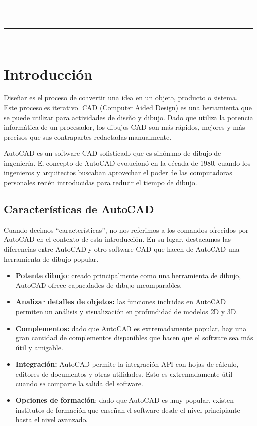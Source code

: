 \documentclass[letterpaper,pdftex]{article}
\begin{document}
\noindent
\textcolor{gray}{\rule{\textwidth}{0.5pt}}\\
\renewcommand{\tablename}{Tabla}
\renewcommand{\arraystretch}{1.2}
\renewcommand\contentsname{Contenido}
\tableofcontents

\noindent
\textcolor{gray}{\rule{\textwidth}{0.5pt}}\\

\section{Introducci\'on}

Diseñar es el proceso de convertir una idea en un objeto, producto o sistema. Este proceso es iterativo. CAD (Computer Aided Design) es una herramienta que se puede utilizar para actividades de diseño y dibujo. Dado que utiliza la potencia informática de un procesador, los dibujos CAD son más rápidos, mejores y más precisos que sus contrapartes redactadas manualmente.

AutoCAD es un software CAD sofisticado que es sinónimo de dibujo de ingeniería. El concepto de AutoCAD evolucionó en la década de 1980, cuando los ingenieros y arquitectos buscaban aprovechar el poder de las computadoras personales recién introducidas para reducir el tiempo de dibujo.

\subsection{Características de AutoCAD}

Cuando decimos ``características'', no nos referimos a los comandos ofrecidos por AutoCAD en el contexto de esta introducción. En su lugar, destacamos las diferencias entre AutoCAD y otro software CAD que hacen de AutoCAD una herramienta de dibujo popular.

\begin{itemize}

\item\textbf{Potente dibujo}: creado principalmente como una herramienta de dibujo, AutoCAD ofrece capacidades de dibujo incomparables.

\item \textbf{Analizar detalles de objetos:} las funciones incluidas en AutoCAD permiten un análisis y visualización en profundidad de modelos 2D y 3D.

\item \textbf{Complementos:} dado que AutoCAD es extremadamente popular, hay una gran cantidad de complementos disponibles que hacen que el software sea más útil y amigable.

\item \textbf{Integración:} AutoCAD permite la integración API con hojas de cálculo, editores de documentos y otras utilidades. Esto es extremadamente útil cuando se comparte la salida del software.

\item \textbf{Opciones de formación}: dado que AutoCAD es muy popular, existen institutos de formación que enseñan el software desde el nivel principiante hasta el nivel avanzado.

\end{itemize}
\end{document}
